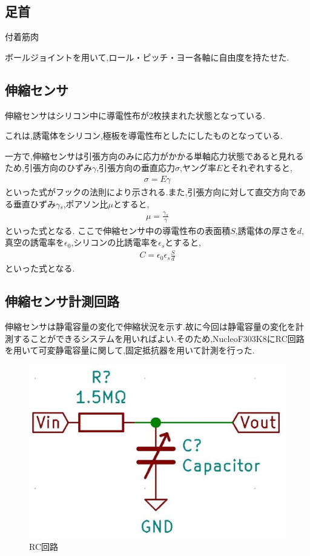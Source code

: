 \subsection{足首}
付着筋肉 %

ボールジョイントを用いて,ロール・ピッチ・ヨー各軸に自由度を持たせた.

\subsection{伸縮センサ}
伸縮センサはシリコン中に導電性布が2枚挟まれた状態となっている.

これは,誘電体をシリコン,極板を導電性布としたにしたものとなっている.

一方で,伸縮センサは引張方向のみに応力がかかる単軸応力状態であると見れるため,引張方向のひずみ$\gamma$,引張方向の垂直応力$\sigma$,ヤング率$E$とそれぞれすると,
\begin{eqnarray}
    \sigma=E\gamma
    \label{フックの法則}
\end{eqnarray}
といった式がフックの法則により示される.また,引張方向に対して直交方向である垂直ひずみ$\gamma{}_s$,ポアソン比$\mu$とすると,
\begin{eqnarray}
    \mu = \frac{\gamma{}_s}{\gamma}
    \label{ポアソン比}
\end{eqnarray}
といった式となる.
ここで伸縮センサ中の導電性布の表面積$S$,誘電体の厚さを$d$,真空の誘電率を$\epsilon{}_0$,シリコンの比誘電率を$\epsilon{}_s$とすると,
\begin{eqnarray}
    C=\epsilon{}_0\epsilon{}_s\frac{S}{d}
\end{eqnarray}
といった式となる.

\subsection{伸縮センサ計測回路}
伸縮センサは静電容量の変化で伸縮状況を示す.故に今回は静電容量の変化を計測することができるシステムを用いればよい.そのため,NucleoF303K8にRC回路を用いて可変静電容量に関して,固定抵抗器を用いて計測を行った.

\begin{figure}[h]
 \begin{center}
  \includegraphics[width=0.75\columnwidth,clip]{Photo/BackGround/RC.eps}
  \caption{RC回路}
  \label{RC}
 \end{center}
\end{figure}


